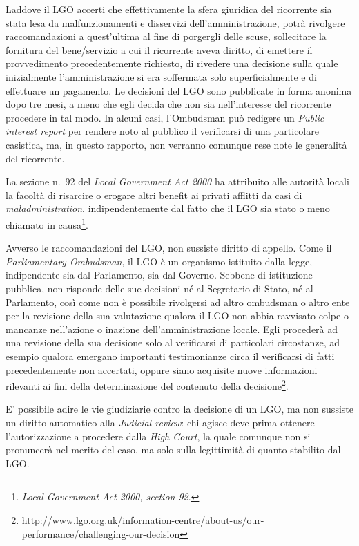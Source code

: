 \documentclass[12pt,it,a4paper,]{report}
\begin{document}
Laddove il LGO accerti che effettivamente la sfera giuridica del
ricorrente sia stata lesa da malfunzionamenti e disservizi
dell'amministrazione, potrà rivolgere raccomandazioni a quest'ultima al
fine di porgergli delle scuse, sollecitare la fornitura del
bene/servizio a cui il ricorrente aveva diritto, di emettere il
provvedimento precedentemente richiesto, di rivedere una decisione sulla
quale inizialmente l'amministrazione si era soffermata solo
superficialmente e di effettuare un pagamento. Le decisioni del LGO sono
pubblicate in forma anonima dopo tre mesi, a meno che egli decida che
non sia nell'interesse del ricorrente procedere in tal modo. In alcuni
casi, l'Ombudsman può redigere un \emph{Public interest report} per
rendere noto al pubblico il verificarsi di una particolare casistica,
ma, in questo rapporto, non verranno comunque rese note le generalità
del ricorrente.

La sezione n.~92 del \emph{Local Government Act 2000} ha attribuito alle
autorità locali la facoltà di risarcire o erogare altri benefit ai
privati afflitti da casi di \emph{maladministration}, indipendentemente
dal fatto che il LGO sia stato o meno chiamato in causa\footnote{\emph{Local
  Government Act 2000, section 92}.}.

Avverso le raccomandazioni del LGO, non sussiste diritto di appello.
Come il \emph{Parliamentary Ombudsman}, il LGO è un organismo istituito
dalla legge, indipendente sia dal Parlamento, sia dal Governo. Sebbene
di istituzione pubblica, non risponde delle sue decisioni né al
Segretario di Stato, né al Parlamento, così come non è possibile
rivolgersi ad altro ombudsman o altro ente per la revisione della sua
valutazione qualora il LGO non abbia ravvisato colpe o mancanze
nell'azione o inazione dell'amministrazione locale. Egli procederà ad
una revisione della sua decisione solo al verificarsi di particolari
circostanze, ad esempio qualora emergano importanti testimonianze circa
il verificarsi di fatti precedentemente non accertati, oppure siano
acquisite nuove informazioni rilevanti ai fini della determinazione del
contenuto della decisione\footnote{http://www.lgo.org.uk/information-centre/about-us/our-performance/challenging-our-decision}.

E' possibile adire le vie giudiziarie contro la decisione di un LGO, ma
non sussiste un diritto automatico alla \emph{Judicial review}: chi
agisce deve prima ottenere l'autorizzazione a procedere dalla \emph{High
Court}, la quale comunque non si pronuncerà nel merito del caso, ma solo
sulla legittimità di quanto stabilito dal LGO.
\end{document}
